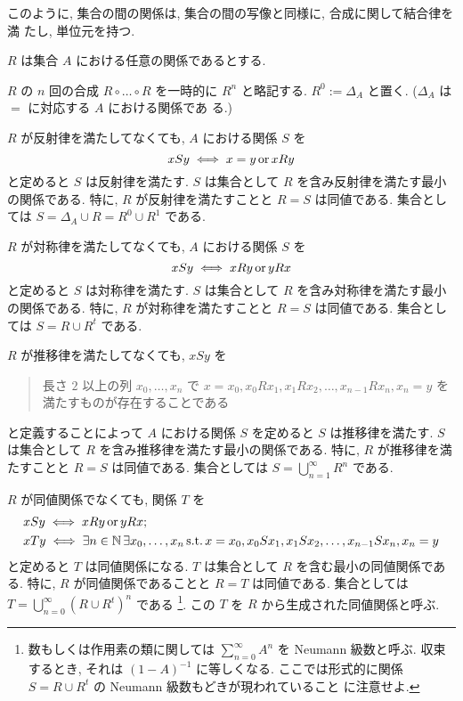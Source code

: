 \documentclass[12pt,twoside]{jarticle}
\def\suchthat{\mathop{\text{\rm s.t.}}}
\def\OR{\mathop{\text{\rm or}}}
\def\N{{\Bbb N}} %
\begin{document}
このように, 集合の間の関係は, 集合の間の写像と同様に, 合成に関して結合律を満
たし, 単位元を持つ.


$R$ は集合 $A$ における任意の関係であるとする.

$R$ の $n$ 回の合成 $R\circ\dots\circ R$ を一時的に $R^n$ と略記する.
$R^0 := \Delta_A$ と置く. ($\Delta_A$ は $=$ に対応する $A$ における関係であ
る.)

$R$ が反射律を満たしてなくても, $A$ における関係 $S$ を
\begin{equation*}
  xSy \iff x=y \OR xRy
\end{equation*}
と定めると $S$ は反射律を満たす. 
$S$ は集合として $R$ を含み反射律を満たす最小の関係である.
特に, $R$ が反射律を満たすことと $R=S$ は同値である.  
集合としては $S=\Delta_A\cup R = R^0 \cup R^1$ である. 

$R$ が対称律を満たしてなくても, $A$ における関係 $S$ を
\begin{equation*}
  xSy \iff xRy \OR yRx
\end{equation*}
と定めると $S$ は対称律を満たす. 
$S$ は集合として $R$ を含み対称律を満たす最小の関係である.
特に, $R$ が対称律を満たすことと $R=S$ は同値である. 
集合としては $S=R\cup R^t$ である.

$R$ が推移律を満たしてなくても, $xSy$ を
\begin{quote}
  長さ $2$ 以上の列 $x_0,\dots,x_n$ で %
  $x=x_0, x_0Rx_1, x_1Rx_2, \dots, x_{n-1}Rx_n, x_n=y$ を%
  満たすものが存在することである
\end{quote}
と定義することによって $A$ における関係 $S$ を定めると $S$ は推移律を満たす.
$S$ は集合として $R$ を含み推移律を満たす最小の関係である.
特に, $R$ が推移律を満たすことと $R=S$ は同値である.
集合としては $S=\bigcup_{n=1}^\infty R^n$ である.

$R$ が同値関係でなくても, 関係 $T$ を
\begin{align*} 
  & xSy \iff xRy \OR yRx; \\
  & xTy \iff \exists n\in\N\, \exists x_0,\ldots,x_n \suchthat
             x=x_0, x_0Sx_1, x_1Sx_2, \dots, x_{n-1}Sx_n, x_n=y
\end{align*}
と定めると $T$ は同値関係になる. 
$T$ は集合として $R$ を含む最小の同値関係である.
特に, $R$ が同値関係であることと $R=T$ は同値である. 
集合としては $T = \bigcup_{n=0}^\infty (R\cup R^t)^n$ である%
\footnote{数もしくは作用素の類に関しては $\sum_{n=0}^\infty A^n$ を Neumann 
  級数と呼ぶ. 収束するとき, それは $(1-A)^{-1}$ に等しくなる. 
  ここでは形式的に関係 $S=R\cup R^t$ の Neumann 級数もどきが現われていること
  に注意せよ.}.
この $T$ を $R$ から生成された同値関係と呼ぶ.
\end{document}
